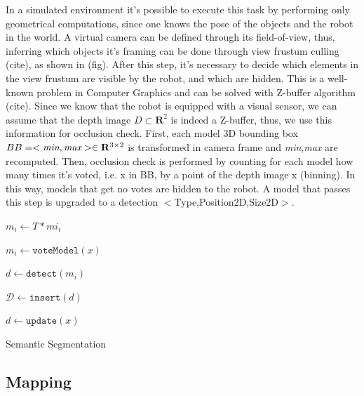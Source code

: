 \documentclass{article}
\begin{document}
	In a simulated environment it's possible to execute this task by performing only geometrical computations, since one knows the pose of the objects and the robot in the world.	A virtual camera can be defined through its field-of-view, thus, inferring which objects it's framing can be done through view frustum culling (cite), as shown in (fig). After this step, it's necessary to decide which elements in the view frustum are visible by the robot, and which are hidden. This is a well-known problem in Computer Graphics and can be solved with Z-buffer algorithm (cite). Since we know that the robot is equipped with a visual sensor, we can assume that the depth image $D \subset \mathbf{R}^2$ is indeed a Z-buffer, thus, we use this information for occlusion check. First, each model 3D bounding box $BB = < \emph{min} ,\emph{max} > \in \mathbf{R}^{3 \times 2}$ is transformed in camera frame and \emph{min},\emph{max} are recomputed. Then, occlusion check is performed by counting for each model how many times it's voted, i.e. x in BB, by a point of the depth image x (binning). In this way, models that get no votes are hidden to the robot. A model that passes this step is upgraded to a detection $<$Type,Position2D,Size2D$>$. 
	
	\begin{center}
		\begin{algorithm}[H]
			{
				$m_i \leftarrow T \ast mi_i$
			}
			{
				$m_i \leftarrow \texttt{voteModel}(x)$
				
				{
					$d \leftarrow \texttt{detect}(m_i)$
					
					$\mathcal{D} \leftarrow \texttt{insert}(d)$
				}
				
				$d \leftarrow \texttt{update}(x)$
			}
		\caption{Semantic Segmentation}
		\end{algorithm}
	\end{center}
	
	\subsection{Mapping}
	
\end{document}
